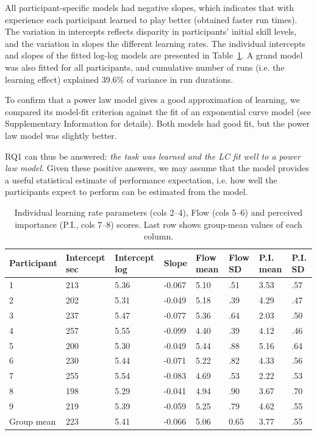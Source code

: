 \documentclass[fleqn,10pt]{wlscirep}
\begin{document}
All participant-specific models had negative slopes, which indicates that with experience each participant learned to play better (obtained faster run times). The variation in intercepts reflects disparity in participants’ initial skill levels, and the variation in slopes the different learning rates. The individual intercepts and slopes of the fitted log-log models are presented in Table~\ref{tab:LCxFlow}. A grand model was also fitted for all participants, and cumulative number of runs (i.e. the learning effect) explained 39.6\% of variance in run durations.

To confirm that a power law model gives a good approximation of learning, we compared its model-fit criterion against the fit of an exponential curve model (see Supplementary Information for details). Both models had good fit, but the power law model was slightly better.

RQ1 can thus be answered: {\it the task was learned and the LC fit well to a power law model}. Given these positive answers, we may assume that the model provides a useful statistical estimate of performance expectation, i.e. how well the participants expect to perform can be estimated from the model.

\begin{table}[ht]
\centering
\caption{\label{tab:LCxFlow}Individual learning rate parameters (cols 2--4), Flow (cols 5--6) and perceived importance (P.I., cols 7--8) scores. Last row shows group-mean values of each column.}
\begin{tabular}{llllllll}
\hline
Participant & Intercept sec & Intercept log & Slope  & Flow mean & Flow SD & P.I. mean & P.I. SD \\
\hline
1           & 213     & 5.36      & -0.067 & 5.10      & .51     & 3.53      & .57     \\
2           & 202     & 5.31      & -0.049 & 5.18      & .39     & 4.29      & .47     \\
3           & 237     & 5.47      & -0.077 & 5.36      & .64     & 2.03      & .50     \\
4           & 257     & 5.55      & -0.099 & 4.40      & .39     & 4.12      & .46     \\
5           & 200     & 5.30      & -0.049 & 5.44      & .88     & 5.16      & .64     \\
6           & 230     & 5.44      & -0.071 & 5.22      & .82     & 4.33      & .56     \\
7           & 255     & 5.54      & -0.083 & 4.69      & .53     & 2.22      & .53     \\
8           & 198     & 5.29      & -0.041 & 4.94      & .90     & 3.67      & .70     \\
9           & 219     & 5.39      & -0.059 & 5.25      & .79     & 4.62      & .55     \\
\hline
Group mean  & 223     & 5.41      & -0.066 & 5.06      & 0.65    & 3.77      & .55    \\
\hline
\end{tabular}
\end{table}
\end{document}
